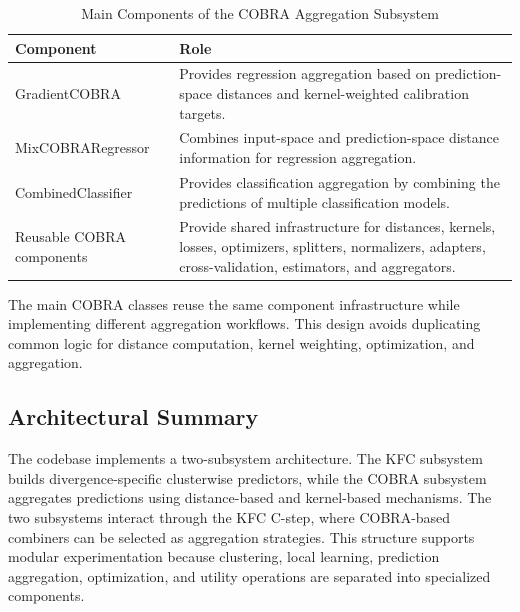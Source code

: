 \begin{table}[H]
      \centering
      \caption{Main Components of the COBRA Aggregation Subsystem}
      \label{tab:cobra_subsystem_components}
      \renewcommand{\arraystretch}{1.2}
      \begin{tabularx}{\textwidth}{
                  >{\raggedright\arraybackslash}p{3.8cm}
                  >{\raggedright\arraybackslash}X
            }
            \toprule
            \textbf{Component}        & \textbf{Role}                                                                                                                  \\
            \midrule
            GradientCOBRA             &
            Provides regression aggregation based on prediction-space distances and kernel-weighted calibration targets.                                               \\

            MixCOBRARegressor         &
            Combines input-space and prediction-space distance information for regression aggregation.                                                                 \\

            CombinedClassifier        &
            Provides classification aggregation by combining the predictions of multiple classification models.                                                        \\

            Reusable COBRA components &
            Provide shared infrastructure for distances, kernels, losses, optimizers, splitters, normalizers, adapters, cross-validation, estimators, and aggregators. \\
            \bottomrule
      \end{tabularx}

\end{table}

The main COBRA classes reuse the same component infrastructure while implementing different aggregation workflows. This design avoids duplicating common logic for distance computation, kernel weighting, optimization, and aggregation.

\subsection{Architectural Summary}

\hs The codebase implements a two-subsystem architecture. The KFC subsystem builds divergence-specific clusterwise predictors, while the COBRA subsystem aggregates predictions using distance-based and kernel-based mechanisms. The two subsystems interact through the KFC C-step, where COBRA-based combiners can be selected as aggregation strategies. This structure supports modular experimentation because clustering, local learning, prediction aggregation, optimization, and utility operations are separated into specialized components.


